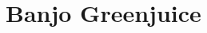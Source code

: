 \documentclass[class=myArticleClass, float=false, crop=false]{standalone}
\begin{document}
\section{Banjo Greenjuice}
\label{aBG}
\end{document}
